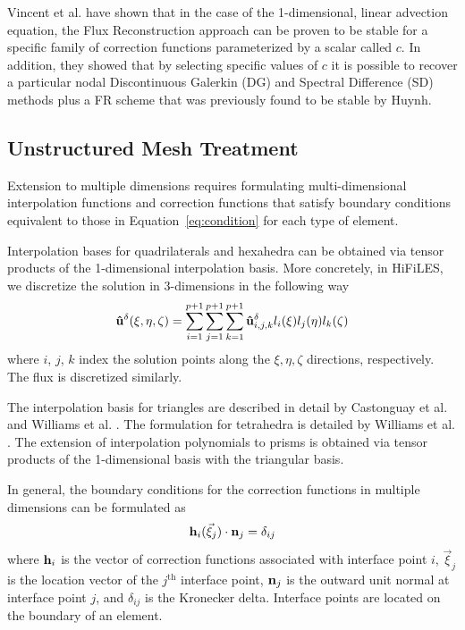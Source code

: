 Vincent et al. \cite{vincent2011new} have shown that in the case of the 1-dimensional, linear advection equation, the Flux Reconstruction approach can be proven to be stable for a specific family of correction functions parameterized by a scalar called $c$. In addition, they showed that by selecting specific values of $c$ it is possible to recover a particular nodal Discontinuous Galerkin (DG) and Spectral Difference (SD) methods plus a FR scheme that was previously found to be stable by Huynh\cite{huynh2007flux}.

\subsection{Unstructured Mesh Treatment}

Extension to multiple dimensions requires formulating multi-dimensional interpolation functions and correction functions that satisfy boundary conditions equivalent to those in Equation~\eqref{eq:condition} for each type of element.

Interpolation bases for quadrilaterals and hexahedra can be obtained via tensor products of the 1-dimensional interpolation basis. More concretely, in HiFiLES, we discretize the solution in 3-dimensions in the following way
\begin{equation}
{\bf \hat{u}}^\delta(\xi,\eta,\zeta) = \sum_{i=1}^{p+1} \sum_{j=1}^{p+1} \sum_{k=1}^{p+1}
{\bf \hat{u}}^\delta_{i,j,k} l_i(\xi) l_j(\eta) l_k(\zeta)
\end{equation}
where $i$, $j$, $k$ index the solution points along the $\xi, \eta, \zeta$ directions, respectively. The flux is discretized similarly.

The interpolation basis for triangles are described in detail by Castonguay et al. \cite{castonguay2012new} and Williams et al. \cite{williams2013tri}. The formulation for tetrahedra is detailed by Williams et al. \cite{williams2013tet}. The extension of interpolation polynomials to prisms is obtained via tensor products of the 1-dimensional basis with the triangular basis\cite{castonguay2011}. 

In general, the boundary conditions for the correction functions in multiple dimensions can be formulated as
\begin{equation}\label{eq:genConstraint}
{\bf h}_i( \vec{\xi}_j)\cdot {\bf n}_j = \delta_{ij}
\end{equation}
where ${\bf h}_i$ is the vector of correction functions associated with interface point $i$, $\vec{\xi}_j$ is the location vector of the $j^\text{th}$ interface point, ${\bf n}_j$ is the outward unit normal at interface point $j$, and $\delta_{ij}$ is the Kronecker delta. Interface points are located on the boundary of an element.

